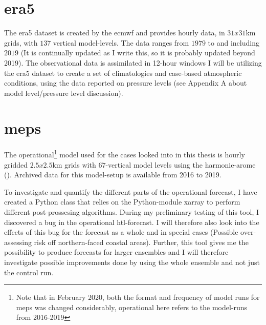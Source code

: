 \section{\acrfull{era5}}
The \acrshort{era5} dataset is created by the \acrfull{ecmwf} and provides hourly data, in $31x31$km grids, with $137$ vertical model-levels. The data ranges from $1979$ to and including $2019$ (It is continually updated as I write this, so it is probably updated beyond 2019). The observational data is assimilated in 12-hour windows \cite{era5}
I will be utilizing the \acrshort{era5} dataset to create a set of climatologies and case-based atmospheric conditions, using the data reported on pressure levels (see Appendix A about model level/pressure level discussion). 

\section{\acrfull{meps}}
The operational\footnote{Note that in February 2020, both the format and frequency of model runs for \acrshort{meps} was changed considerably, operational here refers to the model-runs from 2016-2019} model used for the cases looked into in this thesis is hourly gridded $2.5x2.5$km grids with $67$-vertical model levels using the harmonie-arome (\cite{aromehirlam}). Archived data for this model-setup is available from 2016 to 2019.

To investigate and quantify the different parts of the operational forecast, I have created a Python class that relies on the Python-module xarray to perform different post-prossesing algorithms. During my preliminary testing of this tool, I discovered a bug in the operational \acrshort{htl}-forecast. I will therefore also look into the effects of this bug for the forecast as a whole and in special cases (Possible over-assessing risk off northern-faced coastal areas). Further, this tool gives me the possibility to produce forecasts for larger ensembles and I will therefore investigate possible improvements done by using the whole ensemble and not just the control run.

